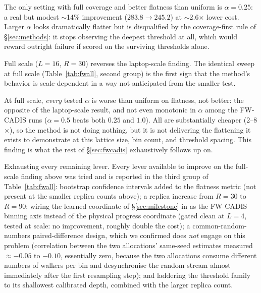 \documentclass[a4paper,fleqn]{cas-sc}
\begin{document}
The only setting with full coverage and better flatness than uniform is $\alpha=0.25$: a
real but modest $\sim$14\% improvement ($283.8\to245.2$) at $\sim$2.6$\times$ lower cost.
Larger $\alpha$ looks dramatically flatter but is disqualified by the coverage-first rule
of \S\ref{sec:methods}: it stops observing the deepest threshold at all, which would reward
outright failure if scored on the surviving thresholds alone.

Full scale ($L=16$, $R=30$) reverses the laptop-scale finding. The identical sweep
at full scale (Table~\ref{tab:fwall}, second group) is the first sign that the method's
behavior is scale-dependent in a way not anticipated from the smaller test.

At full scale, \emph{every} tested $\alpha$ is worse than uniform on flatness, not better:
the opposite of the laptop-scale result, and not even monotonic in $\alpha$ among the
FW-CADIS runs ($\alpha=0.5$ beats both $0.25$ and $1.0$). All are substantially cheaper
(2--8$\times$), so the method is not doing nothing, but it is not delivering the flattening
it exists to demonstrate at this lattice size, bin count, and threshold spacing. This
finding is what the rest of \S\ref{sec:fwcadis} exhaustively follows up on.

Exhausting every remaining lever. Every lever available to improve on the full-scale
finding above was tried and is reported in the third group of Table~\ref{tab:fwall}:
bootstrap confidence
intervals added to the flatness metric (not present at the smaller replica counts above); a
replica increase from $R=30$ to $R=90$; wiring the learned coordinate of
\S\ref{sec:milestone} in as the FW-CADIS binning axis instead of the physical progress
coordinate (gated clean at $L=4$, tested at scale: no improvement, roughly double the
cost); a common-random-numbers paired-difference design, which we confirmed does
\emph{not} engage on this problem (correlation between the two allocations'
same-seed estimates measured $\approx-0.05$ to $-0.10$, essentially zero, because the two
allocations consume different numbers of walkers per bin and desynchronise the random
stream almost immediately after the first resampling step); and laddering the threshold
family to its shallowest calibrated depth, combined with the larger replica count.
\end{document}
